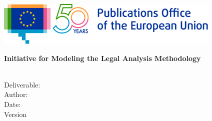 \begin{center}
\vspace{1cm}

  \begin{center}


  \includegraphics[scale=.71]{images/logos/OP-50years-EN}
  \vspace{2mm}

  \end{center}
  \vspace{4cm}
  \textbf{{\large Initiative for Modeling the Legal Analysis Methodology\\}}
  \vspace{2cm}
  
  \begin{spacing}{2.5}
    \textbf{\Huge \DelTitle}\\ \vspace{2cm}
    {\large Deliverable: \DelNumber} \\ %
	{\large Author: \DelAuthor} \\ %
	{\large Date: \DelDate} \\ %
    {\large Version \DelVersion}
  \end{spacing}
  
  \vspace*{\fill}


\end{center}

